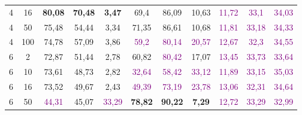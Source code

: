 \begin{table}[ht]
\begin{tabular}{cc|ccc|ccc|ccc}
        {4}                           & {16}   & {\textbf{80,08}}                    & {\textbf{70,48}}                    & {\textbf{3,47}}                          & {69,4}                    & {86,09}                   & {10,63}                   & \textcolor{purple}{11,72} & \textcolor{purple}{33,1}  & \textcolor{purple}{34,03} \\
        {4}                           & {50}   & {75,48}                             & {54,44}                             & {3,34}                                   & {71,35}                   & {86,61}                   & {10,68}                   & \textcolor{purple}{11,81} & \textcolor{purple}{33,18} & \textcolor{purple}{34,33} \\
        {4}                           & {100}  & {74,78}                             & {57,09}                             & {3,86}                                   & \textcolor{purple}{59,2}  & \textcolor{purple}{80,14} & \textcolor{purple}{20,57} & \textcolor{purple}{12,67} & \textcolor{purple}{32,3}  & \textcolor{purple}{34,55} \\
        {6}                           & {2}    & {72,87}                             & {51,44}                             & {2,78}                                   & {60,82}                   & \textcolor{purple}{80,42} & {17,07}                   & \textcolor{purple}{13,45} & \textcolor{purple}{33,73} & \textcolor{purple}{33,64} \\
        {6}                           & {10}   & {73,61}                             & {48,73}                             & {2,82}                                   & \textcolor{purple}{32,64} & \textcolor{purple}{58,42} & \textcolor{purple}{33,12} & \textcolor{purple}{11,89} & \textcolor{purple}{33,15} & \textcolor{purple}{35,03} \\
        {6}                           & {16}   & {73,52}                             & {49,67}                             & {2,43}                                   & \textcolor{purple}{49,39} & \textcolor{purple}{73,19} & \textcolor{purple}{23,78} & \textcolor{purple}{13,06} & \textcolor{purple}{32,31} & \textcolor{purple}{34,64} \\
        {6}                           & {50}   & \textcolor{purple}{44,31}           & {45,07}                             & \textcolor{purple}{33,29}                & {\textbf{78,82}}          & {\textbf{90,22}}          & {\textbf{7,29}}           & \textcolor{purple}{12,72} & \textcolor{purple}{33,29} & \textcolor{purple}{32,99} \\

\end{tabular}
\end{table}
